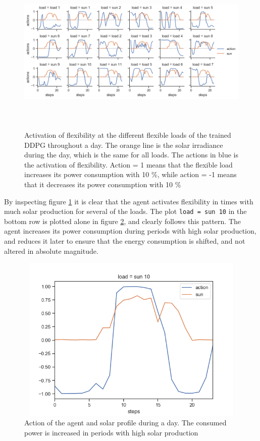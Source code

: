 \documentclass[class=book, crop=false]{standalone}
\begin{document}
\begin{figure}[ht]
    \center
    \includegraphics[height=8cm, width=15cm]{figures/configuration1.png}
    \caption[size = 9]{Activation of flexibility at the different flexible loads of the trained DDPG throughout a day. The orange line is the solar irradiance during the day, which is the same for all loads. The actions in blue is the activation of flexibility. Action = 1 means that the flexible load increases its power consumption with 10 \%, while action = -1 means that it decreases its power consumption with 10 \%}
    \label{fig:results:configuration1}
\end{figure}
By inspecting figure \ref{fig:results:configuration1} it is clear that the agent activates flexibility in times with much solar production for several of the loads. The plot \texttt{load = sun 10} in the bottom row is plotted alone in figure \ref{fig:results:configuration1_follows_sun}, and clearly follows this pattern. The agent increases its power consumption during periods with high solar production, and reduces it later to ensure that the energy consumption is shifted, and not altered in absolute magnitude.

\begin{figure}[ht]
    \center
\includegraphics[height=8cm, width=12cm]{figures/configuration1_follows_sun.png}
    \caption[size = 9]{Action of the agent and solar profile during a day. The consumed power is increased in periods with high solar production}
    \label{fig:results:configuration1_follows_sun}
\end{figure}
\end{document}
